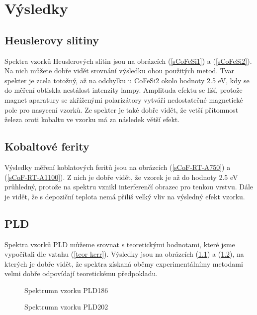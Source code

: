 \chapter{Výsledky}
\section{Heuslerovy slitiny}
Spektra vzorků Heuslerových slitin jsou na obrázcích (\ref{sCoFeSi1}) a (\ref{sCoFeSi2}). Na nich můžete dobře vidět srovnání výsledku obou použitých metod. Tvar spekter je zcela totožný, až na odchylku u CoFeSi2 okolo hodnoty 2.5 eV, kdy se do měření obtiskla nestálost intenzity lampy. Amplituda efektu se liší, protože magnet aparatury se zkříženými polarizátory vytváří nedostatečné magnetické pole pro nasycení vzorků. Ze spekter je také dobře vidět, že vetší přítomnost železa oroti kobaltu ve vzorku má za následek větší efekt.

\section{Kobaltové ferity}
Výsledky měření koblatových feritů jsou na obrázcích (\ref{sCoF-RT-A750}) a (\ref{sCoF-RT-A1100}). Z nich je dobře vidět, že vzorek je až do hodnoty 2.5 eV průhledný, protože na spektru vznikl interferenčí obrazec pro tenkou vrstvu. Dále je vidět, že s depoziční teplota nemá příliš velký vliv na výsledný efekt vzorku.

\section{PLD}
Spektra vzorků PLD můžeme srovnat s teoretickými hodnotami, které jsme vypočítali dle vztahu (\ref{teor kerr}). Výsledky jsou na obrázcích (\ref{sPLD189}) a (\ref{sPLD202}), na kterých je dobře vidět, že spektra získaná oběmy experimentálnímy metodami velmi dobře odpovídají teoretickému předpokladu.

\begin{figure}

\caption{Spektrumn vzorku PLD186}
\label{sPLD189}
\end{figure}

%

\begin{figure}
%
\caption{Spektrumn vzorku PLD202}
\label{sPLD202}
\end{figure}

